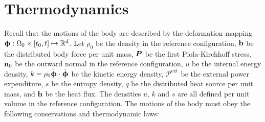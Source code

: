 \section{Thermodynamics}
\label{section: Chapter2/thermodynamics}

Recall that the motions of the body are described by the deformation mapping $\boldsymbol{\upphi}: \Omega_0 \times [t_0, t] \mapsto \mathbb{R}^d$.
Let $\rho_0$ be the density in the reference configuration, $\textbf{b}$ be the distributed body force per unit mass, $\boldsymbol{P}$ be the first Piola-Kirchhoff stress, $\textbf{n}_0$ be the outward normal in the reference configuration, $u$ be the internal energy density, $k = \rho_0 \dot{\boldsymbol{\upphi}} \cdot \dot{\boldsymbol{\upphi}}$ be the kinetic energy density, $\mathcal{P}^\text{ext}$ be the external power expenditure, $s$ be the entropy density, $q$ be the distributed heat source per unit mass, and $\textbf{h}$ be the heat flux. The densities $u$, $k$ and $s$ are all defined per unit volume in the reference configuration.
The motions of the body must obey the following conservations and thermodynamic laws:

